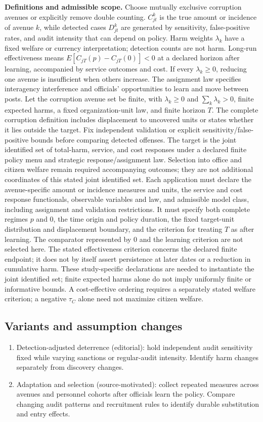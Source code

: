 \documentclass[11pt,a4paper]{article}
\begin{document}
\textbf{Definitions and admissible scope.} Choose mutually exclusive corruption avenues or explicitly remove double counting. \(C^k_{jt}\) is the true amount or incidence of avenue \(k\), while detected cases \(D^k_{jt}\) are generated by sensitivity, false-positive rates, and audit intensity that can depend on policy. Harm weights \(\lambda_k\) have a fixed welfare or currency interpretation; detection counts are not harm. Long-run effectiveness means \(E[C_{jT}(p)-C_{jT}(0)]<0\) at a declared horizon after learning, accompanied by service outcomes and cost. If every \(\lambda_k\ge0\), reducing one avenue is insufficient when others increase. The assignment law specifies interagency interference and officials' opportunities to learn and move between posts. Let the corruption avenue set be finite, with \(\lambda_k\ge0\) and \(\sum_k\lambda_k>0\), finite expected harms, a fixed organization-unit law, and finite horizon \(T\). The complete corruption definition includes displacement to uncovered units or states whether it lies outside the target. Fix independent validation or explicit sensitivity/false-positive bounds before comparing detected offenses. The target is the joint identified set of total-harm, service, and cost responses under a declared finite policy menu and strategic response/assignment law. Selection into office and citizen welfare remain required accompanying outcomes; they are not additional coordinates of this stated joint identified set. Each application must declare the avenue-specific amount or incidence measures and units, the service and cost response functionals, observable variables and law, and admissible model class, including assignment and validation restrictions. It must specify both complete regimes \(p\) and \(0\), the time origin and policy duration, the fixed target-unit distribution and displacement boundary, and the criterion for treating \(T\) as after learning. The comparator represented by \(0\) and the learning criterion are not selected here. The stated effectiveness criterion concerns the declared finite endpoint; it does not by itself assert persistence at later dates or a reduction in cumulative harm. These study-specific declarations are needed to instantiate the joint identified set; finite expected harms alone do not imply uniformly finite or informative bounds. A cost-effective ordering requires a separately stated welfare criterion; a negative \(\tau_C\) alone need not maximize citizen welfare.
\subsection*{Variants and assumption changes}
\begin{enumerate}
\item Detection-adjusted deterrence (editorial): hold independent audit sensitivity fixed while varying sanctions or regular-audit intensity. Identify harm changes separately from discovery changes.
\item Adaptation and selection (source-motivated): collect repeated measures across avenues and personnel cohorts after officials learn the policy. Compare changing audit patterns and recruitment rules to identify durable substitution and entry effects.
\end{enumerate}
\end{document}

